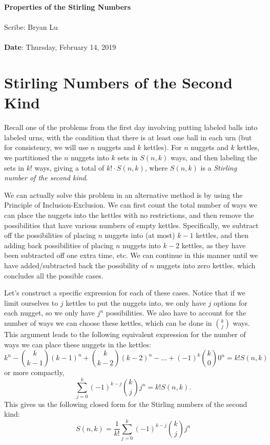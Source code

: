 \documentclass[11pt,twosided]{article}
\def\titlestring{Properties of the Stirling Numbers}
\def\scribestring{Bryan Lu}
\def\datestring{Thursday, February 14, 2019}
\begin{document}
\thispagestyle{plain}  %

\noindent
{\LARGE \textbf{\titlestring}}\\\\
%
{\Large Scribe: \scribestring}\\ \\
{\textbf{Date}: \datestring}


\noindent

\section{Stirling Numbers of the Second Kind}
Recall one of the problems from the first day involving putting labeled balls into labeled urns, with the condition that there is at least one ball in each urn (but for consistency, we will use $n$ nuggets and $k$ kettles). For $n$ nuggets and $k$ kettles, we partitioned the $n$ nuggets into $k$ sets in $S(n, k)$ ways, and then labeling the sets in $k!$ ways, giving a total of $k! \cdot S(n, k)$, where $S(n, k)$ is a \textit{Stirling number of the second kind}. 

We can actually solve this problem in an alternative method is by using the Principle of Inclusion-Exclusion. We can first count the total number of ways we can place the nuggets into the kettles with no restrictions, and then remove the possibilities that have various numbers of empty kettles. Specifically, we subtract off the possibilities of placing $n$ nuggets into (at most) $k-1$ kettles, and then adding back possibilities of placing $n$ nuggets into $k-2$ kettles, as they have been subtracted off one extra time, etc. We can continue in this manner until we have added/subtracted back the possibility of $n$ nuggets into zero kettles, which concludes all the possible cases. 

Let's construct a specific expression for each of these cases. Notice that if we limit ourselves to $j$ kettles to put the nuggets into, we only have $j$ options for each nugget, so we only have $j^n$ possibilities. We also have to account for the number of ways we can choose these kettles, which can be done in $\binom{k}{j}$ ways. \\
This argument leads to the following equivalent expression for the number of ways we can place these nuggets in the kettles:  
\[
	k^n - \binom{k}{k-1}(k-1)^n + \binom{k}{k-2}(k-2)^n - \ldots + (-1)^k \binom{k}{0} 0^n = k! S(n, k)
\]
or more compactly, 
\[
	\sum_{j=0}^k (-1)^{k-j} \binom{k}{j} j^n = k! S(n, k). 
\]
This gives us the following closed form for the Stirling numbers of the second kind: 
\[
	S(n, k) = \frac{1}{k!} \sum_{j=0}^k (-1)^{k-j} \binom{k}{j} j^n 
\]
\end{document}
